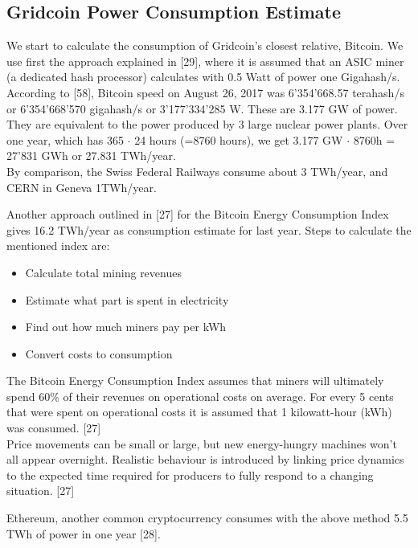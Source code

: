 \subsection{Gridcoin Power Consumption Estimate}

We start to calculate the consumption of Gridcoin's closest relative, Bitcoin. 
We use first the approach explained in [29], where it is assumed that an ASIC miner (a dedicated hash processor) calculates with 0.5 Watt of power one Gigahash/s. According to [58], Bitcoin speed on August 26, 2017 was 6'354'668.57 terahash/s or 6'354'668'570 gigahash/s or 3'177'334'285 W. These are 3.177 GW of power. They are equivalent to the power produced by 3 large nuclear power plants. Over one year, which has 365 $\cdot$ 24 hours (=8760 hours), we get 3.177 GW $\cdot$ 8760h = 27'831 GWh or 27.831 TWh/year.\\ 

By comparison, the Swiss Federal Railways consume about 3 TWh/year, and CERN in Geneva 1TWh/year.

Another approach outlined in [27] for the Bitcoin Energy Consumption Index gives 16.2 TWh/year as consumption estimate for last year. Steps to calculate the mentioned index are:\\

\begin{itemize}
	\item Calculate total mining revenues
	\item Estimate what part is spent in electricity
	\item Find out how much miners pay per kWh
	\item Convert costs to consumption
\end{itemize}

The Bitcoin Energy Consumption Index assumes that miners will ultimately spend 60\% of their revenues on operational costs on average. For every 5 cents that were spent on operational costs it is assumed that 1 kilowatt-hour (kWh) was consumed. [27]\\

Price movements can be small or large, but new energy-hungry machines won't all appear overnight. Realistic behaviour is introduced by linking price dynamics to the expected time required for producers to fully respond to a changing situation. [27]

Ethereum, another common cryptocurrency consumes with the above method 5.5 TWh of power in one year [28].\\

